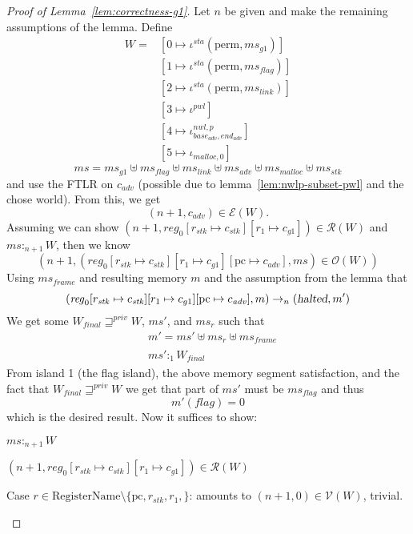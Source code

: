 \documentclass[a4paper]{article}
\newcommand{\update}[2]{[#1 \mapsto #2]}
\newcommand{\var}[1]{\mathit{#1}}
\newcommand{\hs}{\var{ms}}
\newcommand{\ms}{\hs}
\newcommand{\pcreg}{\mathrm{pc}}
\newcommand{\start}{\var{base}}
\newcommand{\addrend}{\var{end}}
\newcommand{\reg}{\var{reg}}
\newcommand{\heap}{\var{mem}}
\newcommand{\adv}{\var{adv}}
\newcommand{\link}{\var{link}}
\newcommand{\stk}{\var{stk}}
\newcommand{\flag}{\var{flag}}
\newcommand{\nwl}{\var{nwl}}
\newcommand{\pwl}{\var{pwl}}
\newcommand{\sta}{\var{sta}}
\newcommand{\halted}{\textsl{halted}}
\newcommand{\futurestr}{\mathbin{\sqsupseteq}^{\var{priv}}}
\newcommand{\heapSat}[3][\heap]{#1 :_{#2} #3}
\newcommand{\memSat}[3][n]{\heapSat[#2]{#1}{#3}}
\newcommand{\codelabel}[1]{\mathit{#1}}
\newcommand{\malloc}{\codelabel{malloc}}
\newcommand{\asmType}{\plaindom{AsmType}}
\newcommand{\plaindom}[1]{\mathrm{#1}}
\newcommand{\RegName}{\plaindom{RegisterName}}
\newcommand{\intr}[2]{\mathcal{#1}}
\newcommand{\valueintr}[1]{\intr{V}{#1}}
\newcommand{\exprintr}[1]{\intr{E}{#1}}
\newcommand{\regintr}[1]{\intr{R}{#1}}
\newcommand{\stdvr}{\valueintr{\asmType}}
\newcommand{\stder}{\exprintr{\asmType}}
\newcommand{\stdrr}{\regintr{\asmType}}
\newcommand{\observations}{\mathcal{O}}
\newcommand{\npair}[2][n]{\left(#1,#2 \right)}
\newcommand{\plainview}[1]{\mathrm{#1}}
\newcommand{\perma}{\plainview{perm}}
\newcommand{\step}[1][]{\rightarrow_{#1}}
\begin{document}
\begin{proof}[Proof of Lemma~\ref{lem:correctness-g1}]
  Let $n$ be given and make the remaining assumptions of the lemma. Define
  \begin{align*}
    W = & [0 \mapsto \iota^\sta (\perma,\ms_{g1})]\\
        & [1 \mapsto \iota^\sta (\perma,\ms_\flag)]\\
        & [2 \mapsto \iota^\sta (\perma,\ms_\link)]\\
        & [3 \mapsto \iota^\pwl]\\
        & [4 \mapsto \iota^{\nwl,p}_{\start_\adv,\addrend_\adv}] \\
        & [5 \mapsto \iota_{\malloc,0}]
  \end{align*}
  \[
    \ms = \ms_{g1} \uplus 
    \ms_\flag \uplus                
    \ms_\link \uplus 
    \ms_\adv \uplus 
    \ms_\malloc \uplus 
    \ms_\stk
  \]
  and use the FTLR on $c_\adv$ (possible due to lemma~\ref{lem:nwlp-subset-pwl} and the chose world). From this, we get
  \[
    \npair[n+1]{c_\adv} \in \stder(W).
  \]
  Assuming we can show $\npair[n+1]{\reg_0\update{r_\stk}{c_\stk}\update{r_1}{c_{g1}}} \in \stdrr(W)$ and $\memSat[n+1]{\ms}{W}$, then we know
  \[
    \npair[n+1]{(\reg_0\update{r_\stk}{c_\stk}\update{r_1}{c_{g1}}\update{\pcreg}{c_\adv},\ms) \in \observations(W)}
  \]
  Using $\ms_{\var{frame}}$ and resulting memory $m$ and the assumption from the lemma that
  \[
    (\reg_0\update{r_\stk}{c_\stk}\update{r_1}{c_{g1}}\update{\pcreg}{c_\adv},m) \step[n] (\halted,m')
  \]
  We get some $W_{\var{final}} \futurestr W$, $\ms'$, and $\ms_r$ such that
  \begin{align*}
    & m' = \ms' \uplus \ms_r \uplus \ms_{\var{frame}}\\
    & \memSat[1]{\ms'}{W_{\var{final}}}
  \end{align*}
  From island 1 (the flag island), the above memory segment satisfaction, and the fact that $W_{\var{final}} \futurestr W$ we get that part of $\ms'$ must be $\ms_\flag$ and thus
  \[
    m'(\flag) = 0
  \]
  which is the desired result. Now it suffices to show:
  \begin{enumproof}
  \item $\memSat[n+1]{\ms}{W}$
  \item $\npair[n+1]{\reg_0\update{r_\stk}{c_\stk}\update{r_1}{c_{g1}}} \in \stdrr(W)$
    \begin{enumproof}
    \item Case $r \in \RegName \setminus \{\pcreg,r_\stk,r_1,\}$: amounts to $\npair[n+1]{0} \in \stdvr(W)$, trivial.

\end{enumproof}
\end{enumproof}
\end{proof}
\end{document}
